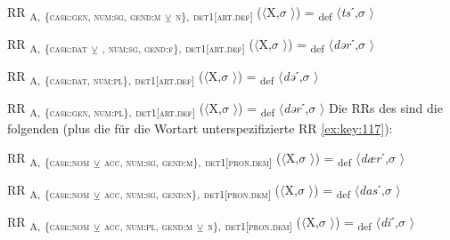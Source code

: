 \ea%
\label{ex:key:126}
 RR \textsubscript{A,} \textsubscript{\{\textsc{case:gen}, \textsc{num:sg}, \textsc{gend:m}} \textsubscript{\tiny $\veebar$} \textsubscript{\scshape n}\textsubscript{\},} \textsubscript{\textsc{det1[art.def]}} ($\langle$X,$\sigma$ $\rangle$) = \textsubscript{def} $\langle$\textit{ts}ˊ,$\sigma$ $\rangle$
\z

\ea%
\label{ex:key:127}
 RR \textsubscript{A,} \textsubscript{\{\textsc{case:dat}} \textsubscript{\tiny ${\veebar}$} \textsubscript{\GEN, \textsc{num:sg}, \textsc{gend:f}\},} \textsubscript{\textsc{det1[art.def]}} ($\langle$X,$\sigma$ $\rangle$) = \textsubscript{def} $\langle$\textit{dər}ˊ,$\sigma$ $\rangle$
\z

\ea%
\label{ex:key:128}
 RR \textsubscript{A,} \textsubscript{\{\textsc{case:dat}, \textsc{num:pl}\},} \textsubscript{\textsc{det1[art.def]}} ($\langle$X,$\sigma$ $\rangle$) = \textsubscript{def} $\langle$\textit{də}ˊ,$\sigma$ $\rangle$
\z

\ea%
\label{ex:key:129}
 RR \textsubscript{A,} \textsubscript{\{\textsc{case:gen}, \textsc{num:pl}\},} \textsubscript{\textsc{det1[art.def]}} ($\langle$X,$\sigma$ $\rangle$) = \textsubscript{def} $\langle$\textit{dər}ˊ,$\sigma$ $\rangle$
\z
\noindent
Die RRs des  sind die folgenden (plus die für die Wortart unterspezifizierte RR \ref{ex:key:117}):

\ea%
\label{ex:key:130}
 RR \textsubscript{A,} \textsubscript{\{\textsc{case:nom}} \textsubscript{\tiny $\veebar$}\textsubscript{ \textsc{acc}}\textsubscript{, \textsc{num:sg}, \textsc{gend:m}\},} \textsubscript{\textsc{det1[pron.dem]}} ($\langle$X,$\sigma$ $\rangle$) = \textsubscript{def} $\langle$\textit{dæ}\textit{r}ˊ,$\sigma$ $\rangle$
\z

\ea%
\label{ex:key:131}
 RR \textsubscript{A,} \textsubscript{\{\textsc{case:nom}} \textsubscript{\tiny $\veebar$}\textsubscript{ \textsc{acc}}\textsubscript{, \textsc{num:sg}, \textsc{gend:n}\},} \textsubscript{\textsc{det1[pron.dem]}} ($\langle$X,$\sigma$ $\rangle$) = \textsubscript{def} $\langle$\textit{das}ˊ,$\sigma$ $\rangle$
\z

\ea%
\label{ex:key:132}
 RR \textsubscript{A,} \textsubscript{\{\textsc{case:nom}} \textsubscript{\tiny $\veebar$}\textsubscript{ \textsc{acc}}\textsubscript{, \textsc{num:pl}, \textsc{gend:m}} \textsubscript{\tiny $\veebar$}\textsubscript{ \textsc{n}\},} \textsubscript{\textsc{det1[pron.dem]}} ($\langle$X,$\sigma$ $\rangle$) = \textsubscript{def} $\langle$\textit{di}ˊ,$\sigma$ $\rangle$
\z

